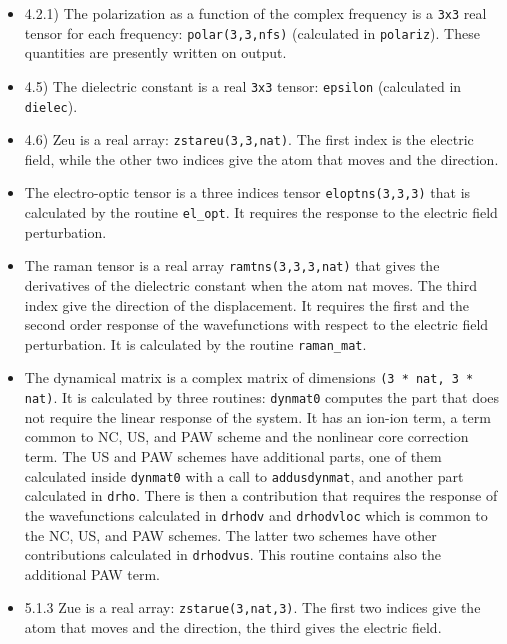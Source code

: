 \documentclass[12pt,a4paper]{article}
\begin{document}
\begin{itemize}

\item
4.2.1) The polarization as a function of the complex frequency is a
\texttt{3x3} real tensor for each frequency: \texttt{polar(3,3,nfs)} 
(calculated in \texttt{polariz}). These quantities are presently written 
on output.

\item
4.5) The dielectric constant is a real \texttt{3x3} tensor: 
\texttt{epsilon} (calculated in \texttt{dielec}). 

\item
4.6) Zeu is a real array: \texttt{zstareu(3,3,nat)}. The first index is 
the electric field, while the other two indices give the atom that moves and the
direction. 

\item
The electro-optic tensor is a three indices tensor \texttt{eloptns(3,3,3)}
that is calculated by the routine \texttt{el\_opt}. It requires the response
to the electric field perturbation.

\item
The raman tensor is a real array \texttt{ramtns(3,3,3,nat)} that
gives the derivatives of the dielectric constant when the atom nat moves.
The third index give the direction of the displacement.
It requires the first and the second order response of the wavefunctions
with respect to the electric field perturbation. It is calculated
by the routine \texttt{raman\_mat}.

\item The dynamical matrix is a complex matrix of dimensions
\texttt{(3 * nat, 3 * nat)}. It is calculated by three routines:
\texttt{dynmat0} computes the part that does not require the linear
response of the system. It has an ion-ion term, a term common to NC, US, and
PAW scheme and the nonlinear core correction term. 
The US and PAW schemes have additional parts, 
one of them calculated inside \texttt{dynmat0} with a call to
\texttt{addusdynmat}, and another part calculated in \texttt{drho}.
There is then a contribution that requires the response of the
wavefunctions calculated in \texttt{drhodv} and \texttt{drhodvloc}
which is common to the NC, US, and PAW schemes. The latter two schemes
have other contributions calculated in \texttt{drhodvus}. This
routine contains also the additional PAW term.

\item
5.1.3 Zue is a real array: \texttt{zstarue(3,nat,3)}. The first two indices 
give the atom that moves and the direction, the third gives the electric 
field. 


\end{itemize}
\end{document}
